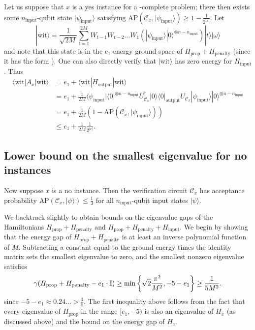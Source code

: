 \documentclass[../thesis-main/thesis-main]{subfiles}
\begin{document}
Let us suppose that  $x$ is a yes instance for a \QMA-complete problem; there then exists some $n_{\text{input}}$-qubit state $|\psi_{\text{input}}\rangle$ satisfying $\text{AP}\left(\mathcal{C}_{x},|\psi_{\text{input}}\rangle\right)\geq1-\frac{1}{2^{|x|}}$. Let
\begin{equation}
|\text{wit}\rangle=\frac{1}{\sqrt{2M}}\sum_{t=1}^{2M}W_{t-1}W_{t-2}\ldots W_{1}\left(|\psi_{\text{input}}\rangle|0\rangle^{\otimes n-n_{\text{input}}}\right)|t\rangle|\omega\rangle
\end{equation}
and note that this state is in the $e_{1}$-energy ground space of
$H_{\text{prop}}+H_{\text{penalty}}$ (since it has the form ).
One can also directly verify that $|\text{wit}\rangle$ has zero energy for $H_{\text{input}}$. Thus
\begin{align}
\langle\text{wit}|A_{x}|\text{wit}\rangle & =e_{1}+\langle\text{wit}|H_{\text{output}}|\text{wit}\rangle\\
 & =e_{1}+\frac{1}{2M}\langle\psi_{\text{input}}|\langle0|^{\otimes n-n_{\text{input}}}U_{\mathcal{C}_{x}}^{\dagger}|0\rangle\langle0|_{\text{output}}U_{\mathcal{C}_{x}}|\psi_{\text{input}}\rangle|0\rangle^{\otimes n-n_{\text{input}}}\\
 & =e_{1}+\frac{1}{2M}\left(1-\text{AP}(\mathcal{C}_{x},|\psi_{\text{input}}\rangle)\right)\\
 & \leq e_{1}+\frac{1}{2M}\frac{1}{2^{|x|}}.
\end{align}


\subsection{Lower bound on the smallest eigenvalue for no instances}
\label{sec:mappingno}

Now suppose $x$ is a no instance. Then the verification circuit $\mathcal{C}_{x}$ has acceptance probability $\text{AP}\left(\mathcal{C}_{x},|\psi\rangle\right)\leq\frac{1}{3}$ for all $n_{\text{input}}$-qubit input states $|\psi\rangle$.

We backtrack slightly to obtain bounds on the eigenvalue gaps of the Hamiltonians $H_{\text{prop}}+H_{\text{penalty}}$ and $H_{\text{prop}}+H_{\text{penalty}}+H_{\text{input}}$. We begin by showing that the energy gap of $H_{\text{prop}}+H_{\text{penalty}}$ is at least an inverse polynomial function of $M$. Subtracting a constant equal to the ground energy times the identity matrix sets the smallest eigenvalue to zero, and the smallest nonzero eigenvalue satisfies 
\begin{equation}
\gamma(H_{\text{prop}}+H_{\text{penalty}}-e_{1}\cdot\mathbb{I})\geq\min\left\{ \sqrt{2}\frac{\pi^{2}}{M^{2}},-5-e_{1}\right\} \geq\frac{1}{5M^{2}}.\label{eq:gamma_Ha}
\end{equation}
since $-5-e_{1}\approx0.24\ldots>\frac{1}{5}$. The first inequality above follows from the fact that every eigenvalue of $H_{\text{prop}}$ in the range $[e_{1},-5)$ is also an eigenvalue of $H_{x}$ (as discussed above) and the bound  on the energy gap of $H_{x}$.
\end{document}

